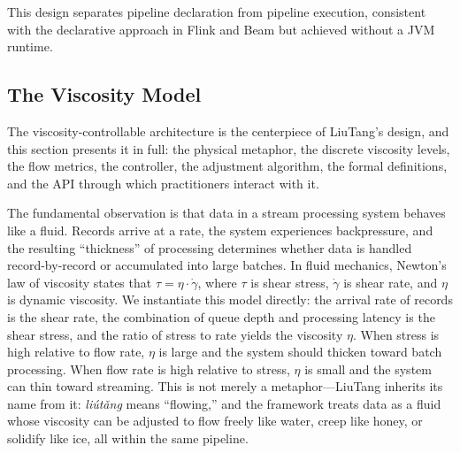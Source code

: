 \documentclass[conference]{IEEEtran}
\begin{document}
This design separates pipeline declaration from pipeline execution, consistent with the declarative approach in Flink and Beam but achieved without a JVM runtime.

\subsection{The Viscosity Model}

The viscosity-controllable architecture is the centerpiece of LiuTang's design, and this section presents it in full: the physical metaphor, the discrete viscosity levels, the flow metrics, the controller, the adjustment algorithm, the formal definitions, and the API through which practitioners interact with it.

The fundamental observation is that data in a stream processing system behaves like a fluid. Records arrive at a rate, the system experiences backpressure, and the resulting ``thickness'' of processing determines whether data is handled record-by-record or accumulated into large batches. In fluid mechanics, Newton's law of viscosity states that $\tau = \eta \cdot \dot{\gamma}$, where $\tau$ is shear stress, $\dot{\gamma}$ is shear rate, and $\eta$ is dynamic viscosity. We instantiate this model directly: the arrival rate of records is the shear rate, the combination of queue depth and processing latency is the shear stress, and the ratio of stress to rate yields the viscosity $\eta$. When stress is high relative to flow rate, $\eta$ is large and the system should thicken toward batch processing. When flow rate is high relative to stress, $\eta$ is small and the system can thin toward streaming. This is not merely a metaphor---LiuTang inherits its name from it: \emph{li\'{u}t\v{a}ng} means ``flowing,'' and the framework treats data as a fluid whose viscosity can be adjusted to flow freely like water, creep like honey, or solidify like ice, all within the same pipeline.
\end{document}
